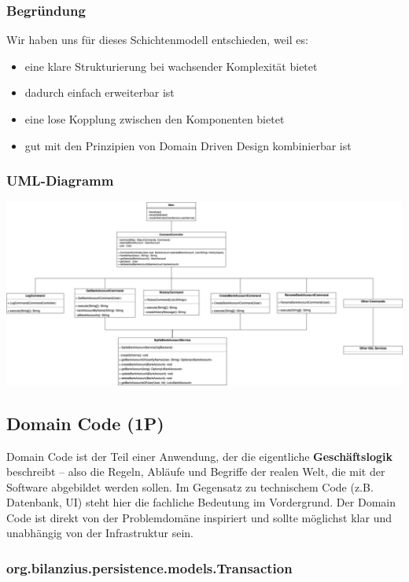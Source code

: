 \subsubsection*{Begründung}
Wir haben uns für dieses Schichtenmodell entschieden, weil es:
\begin{itemize}
    \item eine klare Strukturierung bei wachsender Komplexität bietet
    \item dadurch einfach erweiterbar ist
    \item eine lose Kopplung zwischen den Komponenten bietet
    \item gut mit den Prinzipien von Domain Driven Design kombinierbar ist
\end{itemize}

\subsubsection*{UML-Diagramm}
\includegraphics[width=\linewidth]{kapitel2_architektur/Softwarearchitekturen.drawio.png}



\subsection{Domain Code (1P)}
Domain Code ist der Teil einer Anwendung, der die eigentliche \textbf{Geschäftslogik} beschreibt – also die Regeln, Abläufe und Begriffe der realen Welt, die mit der Software abgebildet werden sollen. Im Gegensatz zu technischem Code (z.B. Datenbank, UI) steht hier die fachliche Bedeutung im Vordergrund. Der Domain Code ist direkt von der Problemdomäne inspiriert und sollte möglichst klar und unabhängig von der Infrastruktur sein.

\subsubsection*{org.bilanzius.persistence.models.Transaction}




